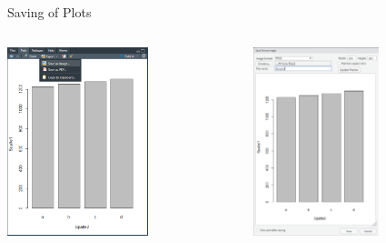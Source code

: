 \documentclass[xcolor=dvipsnames, aspectratio = 169]{beamer}
\begin{document}
\begin{frame}[fragile]{Saving of Plots}
	\begin{columns}[T]
		\begin{column}{0.5\textwidth}
			\begin{center}
				\includegraphics[height=5.5cm]{SaveImage}
			\end{center}
		\end{column}
		\begin{column}{0.5\textwidth}
			\begin{center}
				\includegraphics[height=5.5cm]{SaveImage2}
			\end{center}
		\end{column}
	\end{columns}	
\end{frame}
\end{document}
